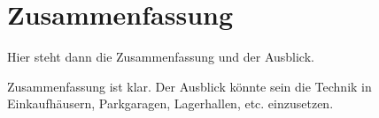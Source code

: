 \chapter{Zusammenfassung}
Hier steht dann die Zusammenfassung und der Ausblick.


Zusammenfassung ist klar. Der Ausblick könnte sein die Technik in Einkaufhäusern, Parkgaragen, Lagerhallen, etc. einzusetzen. 

